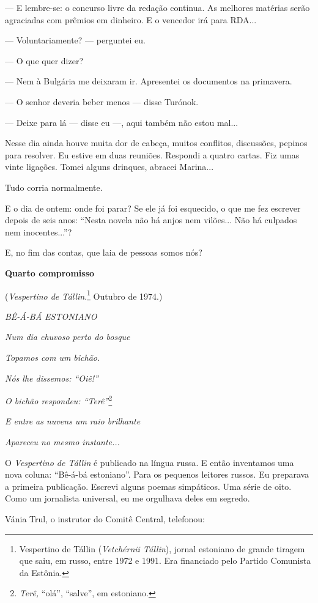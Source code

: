 --- E lembre-se: o concurso livre da redação continua. As melhores
matérias serão agraciadas com prêmios em dinheiro. E o vencedor irá para
RDA...

--- Voluntariamente? --- perguntei eu.

--- O que quer dizer?

--- Nem à Bulgária me deixaram ir. Apresentei os documentos na
primavera.

--- O senhor deveria beber menos --- disse Turónok.

--- Deixe para lá --- disse eu ­---, aqui também não estou mal...

Nesse dia ainda houve muita dor de cabeça, muitos conflitos, discussões,
pepinos para resolver. Eu estive em duas reuniões. Respondi a quatro
cartas. Fiz umas vinte ligações. Tomei alguns drinques, abracei
Marina...

Tudo corria normalmente.

E o dia de ontem: onde foi parar? Se ele já foi esquecido, o que me fez
escrever depois de seis anos: ``Nesta novela não há anjos nem vilões...
Não há culpados nem inocentes...''?

E, no fim das contas, que laia de pessoas somos nós?

\textbf{Quarto compromisso }

(\emph{Vespertino de Tállin}.\footnote{Vespertino de Tállin
  (\emph{Vetchérnii Tállin}), jornal estoniano de grande tiragem que
  saiu, em russo, entre 1972 e 1991. Era financiado pelo Partido
  Comunista da Estônia.} Outubro de 1974.)

\emph{BÊ-Á-BÁ ESTONIANO}

\emph{Num dia chuvoso perto do bosque}

\emph{Topamos com um bichão.}

\emph{Nós lhe dissemos: ``Oiê!''}

\emph{O bichão respondeu: ``Terê''}\footnote{\emph{Terê,} ``olá'',
  ``salve'', em estoniano.}

\emph{E entre as nuvens um raio brilhante}

\emph{Apareceu no mesmo instante...}

O \emph{Vespertino de Tállin} é publicado na língua russa. E então
inventamos uma nova coluna: ``Bê-á-bá estoniano''. Para os pequenos
leitores russos. Eu preparava a primeira publicação. Escrevi alguns
poemas simpáticos. Uma série de oito. Como um jornalista universal, eu
me orgulhava deles em segredo.

Vánia Trul, o instrutor do Comitê Central, telefonou:

